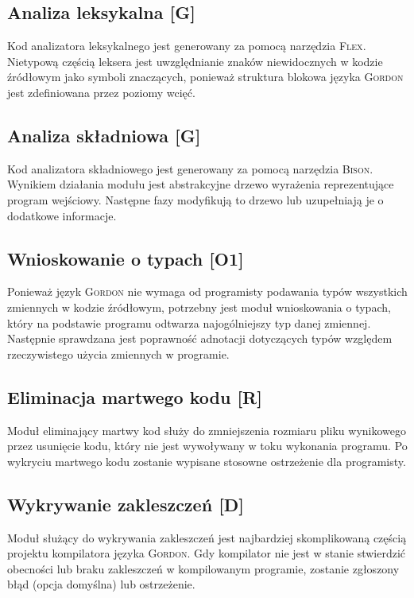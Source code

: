 \documentclass{documentation}
\begin{document}
\subsection{Analiza leksykalna [G]}
\noindent Kod analizatora leksykalnego jest generowany za pomocą narzędzia
\textsc{Flex}. Nietypową częścią leksera jest uwzględnianie znaków
niewidocznych w kodzie źródłowym jako symboli znaczących, ponieważ struktura
blokowa języka \textsc{Gordon} jest zdefiniowana przez poziomy wcięć.  

\subsection{Analiza składniowa [G]}
\noindent Kod analizatora składniowego jest generowany za pomocą narzędzia
\textsc{Bison}.  Wynikiem działania modułu jest abstrakcyjne drzewo wyrażenia
reprezentujące program wejściowy.  Następne fazy modyfikują to drzewo lub
uzupełniają je o dodatkowe informacje.

\subsection{Wnioskowanie o typach [O1]}
\noindent Ponieważ język \textsc{Gordon} nie wymaga od programisty podawania
typów wszystkich zmiennych w kodzie źródłowym, potrzebny jest moduł
wnioskowania o typach, który na podstawie programu odtwarza najogólniejszy typ
danej zmiennej. Następnie sprawdzana jest poprawność adnotacji dotyczących
typów względem rzeczywistego użycia zmiennych w programie.

\subsection{Eliminacja martwego kodu [R]}
\noindent Moduł eliminający martwy kod służy do zmniejszenia rozmiaru pliku
wynikowego przez usunięcie kodu, który nie jest wywoływany w toku wykonania
programu.  Po wykryciu martwego kodu zostanie wypisane stosowne ostrzeżenie dla
programisty.

\subsection{Wykrywanie zakleszczeń [D]} \noindent Moduł służący do wykrywania
zakleszczeń jest najbardziej skomplikowaną częścią projektu kompilatora języka
\textsc{Gordon}. Gdy kompilator nie jest w stanie stwierdzić
obecności lub braku zakleszczeń w kompilowanym programie, zostanie zgłoszony
błąd (opcja domyślna) lub ostrzeżenie.
\end{document}
